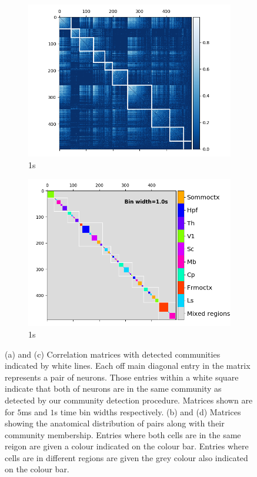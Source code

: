\documentclass[a4paper,12pt]{article}
\theoremstyle{definition}
\begin{document}
\begin{figure}
\begin{subfigure}[h]{0.5\linewidth}
      \label{fig:regional_cluster_map_5ms}
    \end{subfigure}
    \begin{subfigure}[h]{0.5\linewidth}
      \includegraphics[width=\linewidth]{figures/Krebs_1p0_rectified_cons_cluster_map.png}
      \caption{1s}
      \label{fig:consensus_cluster_1s}
    \end{subfigure}
    \begin{subfigure}[h]{0.5\linewidth}
      \includegraphics[width=\linewidth]{figures/Krebs_1p0_regional_cluster_map.png}
      \caption{1s}
      \label{fig:regional_cluster_map_1s}
    \end{subfigure}
    \caption{(a) and (c) Correlation matrices with detected communities indicated by white lines. Each off main diagonal entry in the matrix represents a pair of neurons. Those entries within a white square indicate that both of neurons are in the same community as detected by our community detection procedure. Matrices shown are for $5$ms and $1$s time bin widths respectively. (b) and (d) Matrices showing the anatomical distribution of pairs along with their community membership. Entries where both cells are in the same reigon are given a colour indicated on the colour bar. Entries where cells are in different regions are given the grey colour also indicated on the colour bar.}
    \label{fig:consensus_clusterings_with_regions}
  \end{figure}
\end{document}
